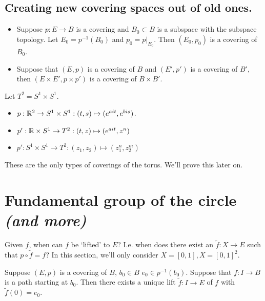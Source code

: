 \subsection*{Creating new covering spaces out of old ones.}

\begin{itemize}
    \item Suppose $p: E \to  B$ is a covering and $B_0 \subset B$ is a subspace with the subspace topology.
        Let $E_0 = p^{-1}(B_0)$ and $p_0 = p|_{E_0}$.
        Then $(E_0, p_0)$ is a covering of $B_0$.

    \item Suppose that $(E, p)$ is a covering of $B$ and $(E', p')$ is a covering of $B'$, then $(E\times E', p\times p')$ is a covering of $B \times B'$.
\end{itemize}

\begin{eg}
    Let $T^{2} = S^{1} \times S^{1}$.

    \begin{itemize}
        \item $p: \mathbb{R}^2 \to  S^{1} \times S^{1}: (t, s) \mapsto  (e^{a i t}, e^{b i s})$.
        \item $p': \mathbb{R} \times S^{1} \to  T^{2}: (t, z) \mapsto (e^{a i t}, z^{n})$
        \item $p': S^{1} \times S^{1} \to  T^{2}: (z_1, z_2) \mapsto (z_1^{n}, z_2^{m})$
    \end{itemize}
    These are the only types of coverings of the torus. We'll prove this later on.
\end{eg}


\section{Fundamental group of the circle \emph{(and more)}}

Given $f$, when can $f$ be `lifted' to $E$?
I.e. when does there exist an $\tilde f : X \to  E$ such that $p \circ \tilde f = f$?
In this section, we'll only consider $X = [0, 1], X = [0, 1]^2$.

\begin{center}
\end{center}


\begin{lemma}
    Suppose $(E, p)$ is a covering of $B$, $b_0 \in B$ $e_0 \in p ^{-1}(b_0)$.
    Suppose that $f: I \to B$ is a path starting at $b_0$.
    Then there exists a unique lift $\tilde f: I \to  E$ of $f$ with $\tilde f(0) =e_0$.
\end{lemma}


